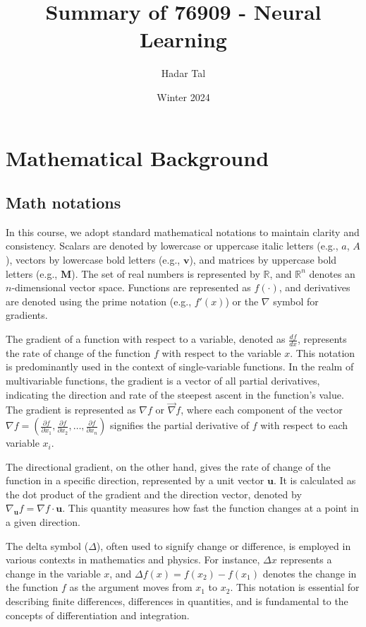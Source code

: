 \documentclass[11pt]{book} %
\title{Summary of 76909 - Neural Learning}
\author{Hadar Tal}
\date{Winter 2024}
\begin{document}
\frontmatter
\maketitle
\tableofcontents

\mainmatter
\chapter{Mathematical Background}

\section{Math notations}

In this course, we adopt standard mathematical notations to maintain clarity and consistency. Scalars are denoted by lowercase or uppercase italic letters (e.g., \(a\), \(A\)), vectors by lowercase bold letters (e.g., \(\mathbf{v}\)), and matrices by uppercase bold letters (e.g., \(\mathbf{M}\)). The set of real numbers is represented by \(\mathbb{R}\), and \(\mathbb{R}^n\) denotes an \(n\)-dimensional vector space. Functions are represented as \(f(\cdot)\), and derivatives are denoted using the prime notation (e.g., \(f'(x)\)) or the \(\nabla\) symbol for gradients.

The gradient of a function with respect to a variable, denoted as \(\frac{df}{dx}\), represents the rate of change of the function \(f\) with respect to the variable \(x\). This notation is predominantly used in the context of single-variable functions. In the realm of multivariable functions, the gradient is a vector of all partial derivatives, indicating the direction and rate of the steepest ascent in the function's value. The gradient is represented as \(\nabla f\) or \(\vec{\nabla} f\), where each component of the vector \(\nabla f = \left(\frac{\partial f}{\partial x_1}, \frac{\partial f}{\partial x_2}, \ldots, \frac{\partial f}{\partial x_n}\right)\) signifies the partial derivative of \(f\) with respect to each variable \(x_i\).

The directional gradient, on the other hand, gives the rate of change of the function in a specific direction, represented by a unit vector \(\mathbf{u}\). It is calculated as the dot product of the gradient and the direction vector, denoted by \(\nabla_{\mathbf{u}} f = \nabla f \cdot \mathbf{u}\). This quantity measures how fast the function changes at a point in a given direction.

The delta symbol (\(\Delta\)), often used to signify change or difference, is employed in various contexts in mathematics and physics. For instance, \(\Delta x\) represents a change in the variable \(x\), and \(\Delta f(x) = f(x_2) - f(x_1)\) denotes the change in the function \(f\) as the argument moves from \(x_1\) to \(x_2\). This notation is essential for describing finite differences, differences in quantities, and is fundamental to the concepts of differentiation and integration.
\end{document}
